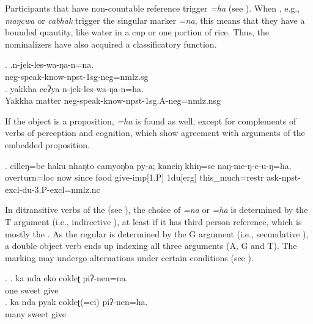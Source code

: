 Participants that have non-countable reference trigger \emph{=ha} (see \Next). When , e.g., \emph{maŋcwa}  or \emph{cabhak}  trigger the singular marker \emph{=na}, this means that they have a bounded quantity, like water in a cup or one portion of rice. Thus, the nominalizers have also acquired a classificatory function.


\ex. \ag.n-jek-les-wa-ŋa-n=na.\\
		{\sc neg}-speak-know{\sc -npst-1sg-neg=nmlz.sg} 	\\
 	\bg. yakkha ceʔya n-jek-les-wa-ŋa-n=ha.\\
	Yakkha matter {\sc neg}-speak-know{\sc -npst-1sg.A-neg=nmlz.nsg} 		\\
	
	
If the object is a proposition, \emph{=ha} is found as well, except for complements of verbs of perception and cognition, which show agreement with arguments of the embedded proposition.


\exg. cilleŋ=be     haku nhaŋto camyoŋba py-a;  kanciŋ khiŋ=se   naŋ-me-ŋ-c-u-ŋ=ha.\\
 overturn{\sc =loc} now since   food give{\sc -imp[1.P]} {\sc 1du[erg]} this\_much{\sc =restr} ask{\sc -npst-excl-du-3.P-excl=nmlz.nc}\\
  	

   
In ditransitive verbs of the  (see ), the choice of \emph{=na} or \emph{=ha}  is determined by the T argument (i.e., indirective ), at least if it has third person reference, which is mostly the . As the regular  is determined by the G argument (i.e., secundative ), a double object verb ends up indexing all three arguments (A, G and T). The marking may undergo alternations under certain conditions (see ).


 \ex. \ag. ka nda eko cokleʈ piʔ-nen=na.\\
			  one sweet give\\
			\bg. ka nda pyak cokleʈ(=ci) piʔ-nen=ha.\\
			  many sweet give\\



